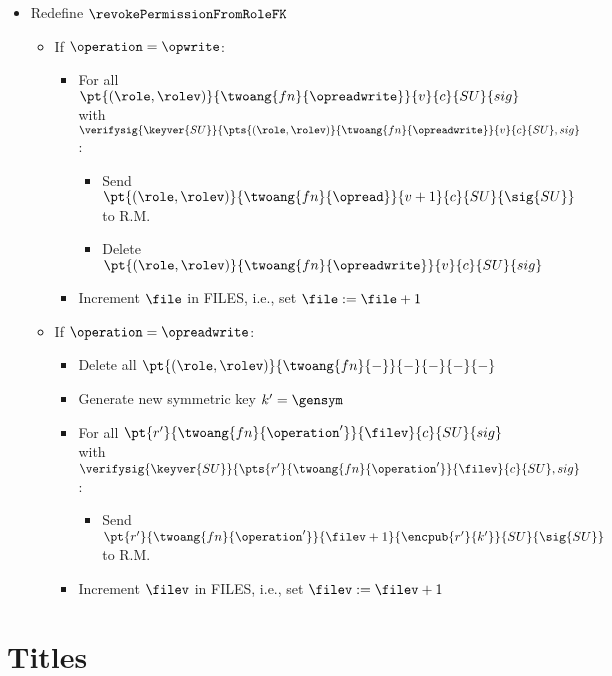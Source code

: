 {\begin{itemize}
        \item Redefine \( \revokePermissionFromRoleFK \)
        \begin{itemize}
            \item If \( \operation = \opwrite \):
            \begin{itemize}
                \item For all \( \pt{(\role, \rolev)}{\twoang{fn}{\opreadwrite}}{v}{c}{SU}{sig} \) with \( \verifysig{\keyver{SU}}{\pts{(\role, \rolev)}{\twoang{fn}{\opreadwrite}}{v}{c}{SU}, sig} \):
                \begin{itemize}
                    \item Send \( \pt{(\role, \rolev)}{\twoang{fn}{\opread}}{{v+1}}{c}{SU}{\sig{SU}} \) to R.M.
                    \item Delete \( \pt{(\role, \rolev)}{\twoang{fn}{\opreadwrite}}{v}{c}{SU}{sig} \)
                \end{itemize}
                \item Increment \( \file \) in FILES, i.e., set \( \file := \file+1 \)
            \end{itemize}
            \item If \( \operation = \opreadwrite \):
            \begin{itemize}
                \item Delete all \( \pt{(\role, \rolev)}{\twoang{fn}{-}}{-}{-}{-}{-} \)
                \item Generate new symmetric key \( k' = \gensym \)
                \item For all \( \pt{r'}{\twoang{fn}{\operation'}}{\filev}{c}{SU}{sig} \) with \( \verifysig{\keyver{SU}}{\pts{r'}{\twoang{fn}{\operation'}}{\filev}{c}{SU}, sig} \):
                \begin{itemize}
                    \item Send \( \pt{r'}{\twoang{fn}{\operation'}}{\filev+1}{\encpub{r'}{k'}}{SU}{\sig{SU}} \) to R.M.
                \end{itemize}
                \item Increment \( \filev \) in FILES, i.e., set \( \filev := \filev+1 \)
            \end{itemize}
        \end{itemize}

    \end{itemize}
}

\section{Titles}

